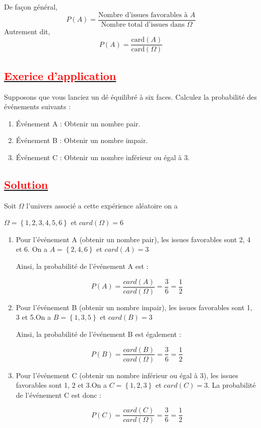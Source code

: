 \documentclass[12pt]{article}
\begin{document}
De façon général, \[ P(A) = \frac{\text{Nombre d'issues favorables à } A}{\text{Nombre total d'issues dans } \Omega} \]
Autrement dit, \[ P(A) = \frac{\text{card} (A)}{\text{card} (\Omega)} \]
\subsection*{\underline{\textbf{\textcolor{red}{Exerice d'application}}}}
Supposons que vous lanciez un dé équilibré à six faces. Calculez la probabilité des événements suivants :

\begin{enumerate}
    \item Événement A : Obtenir un nombre pair.
    \item Événement B : Obtenir un nombre impair.
    \item Événement C : Obtenir un nombre inférieur ou égal à 3.
\end{enumerate}

\subsection*{\underline{\textbf{\textcolor{red}{Solution}}}}
Soit $\Omega$ l'univers associé a cette expérience aléatoire on a

$\Omega=\left\lbrace 1, 2, 3, 4, 5, 6 \right\rbrace $ et $card(\Omega)=6$ 

\begin{enumerate}
    \item Pour l'événement A (obtenir un nombre pair), les issues favorables sont 2, 4 et 6.
      On a $A=\left\lbrace 2, 4, 6 \right\rbrace $ et $card(A)=3$
          
     Ainsi, la probabilité de l'événement A est :
    
    \[ P(A) =\frac{card(A)}{card(\Omega)}=\frac{3}{6} = \frac{1}{2} \]
    
    \item Pour l'événement B (obtenir un nombre impair), les issues favorables sont 1, 3 et 5.On a $B=\left\lbrace 1, 3, 5 \right\rbrace $ et $card(B)=3$
    
     Ainsi, la probabilité de l'événement B est également :
    
    \[ P(B) =\frac{card(B)}{card(\Omega)}=\frac{3}{6} = \frac{1}{2} \]
    
    \item Pour l'événement C (obtenir un nombre inférieur ou égal à 3), les issues favorables sont 1, 2 et 3.On a $C=\left\lbrace 1, 2, 3 \right\rbrace $ et $card(C)=3$.
    La probabilité de l'événement C est donc :
    
    \[ P(C) =\frac{card(C)}{card(\Omega)}=\frac{3}{6} = \frac{1}{2} \]
\end{enumerate}
\end{document}
